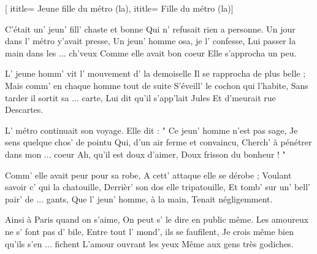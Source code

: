  [
ititle= {Jeune fille du métro (la)},
ititle= {Fille du métro (la)}]


\beginverse
C'était un' jeun' fill' chaste et bonne
Qui n' refusait rien a personne.
Un jour dans l' métro y'avait presse,
Un jeun' homme osa, je l' confesse,
Lui passer la main dans les ... ch'veux
Comme elle avait bon coeur
Elle s'approcha un peu.
\endverse

\beginverse
L' jeune homm' vit l' mouvement d' la demoiselle
Il se rapprocha de plus belle ;
Mais comm' en chaque homme tout de suite
S'éveill' le cochon qui l'habite,
Sans tarder il sortit sa ... carte,
Lui dit qu'il s'app'lait Jules
Et d'meurait rue Descartes.
\endverse

\beginverse
L' métro continuait son voyage.
Elle dit : " Ce jeun' homme n'est pas sage,
Je sens quelque chos' de pointu
Qui, d'un air ferme et convaincu,
Cherch' à pénétrer dans mon ... coeur
Ah, qu'il est doux d'aimer,
Doux frisson du bonheur ! "
\endverse

\beginverse
Comm' elle avait peur pour sa robe,
A cett' attaque elle se dérobe ;
Voulant savoir c' qui la chatouille,
Derrièr' son dos elle tripatouille,
Et tomb' sur un' bell' pair' de ... gants,
Que l' jeun' homme, à la main,
Tenait négligemment.
\endverse

\beginverse
Ainsi à Paris quand on s'aime,
On peut s' le dire en public même.
Les amoureux ne s' font pas d' bile,
Entre tout l' mond', ils se faufilent,
Je crois même bien qu'ils s'en ... fichent
L'amour ouvrant les yeux
Même aux gens très godiches.
\endverse

\endsong